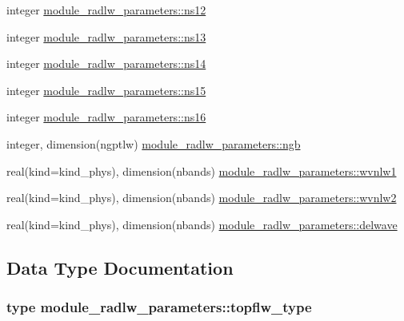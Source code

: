 \begin{DoxyCompactItemize}
\item 
integer \hyperlink{namespacemodule__radlw__parameters_aabdc77471aadc2932eb213f3b7ecb66c}{module\+\_\+radlw\+\_\+parameters\+::ns12}
\item 
integer \hyperlink{namespacemodule__radlw__parameters_a239c74495526cdf72b28e1f5c1d0318e}{module\+\_\+radlw\+\_\+parameters\+::ns13}
\item 
integer \hyperlink{namespacemodule__radlw__parameters_a1d49c23da2ed69069a97f861a28a531e}{module\+\_\+radlw\+\_\+parameters\+::ns14}
\item 
integer \hyperlink{namespacemodule__radlw__parameters_a9662e6bd344b1dbbfa7cc4429753bb10}{module\+\_\+radlw\+\_\+parameters\+::ns15}
\item 
integer \hyperlink{namespacemodule__radlw__parameters_a3a7ba0b8f35271e7979deea86f834479}{module\+\_\+radlw\+\_\+parameters\+::ns16}
\item 
integer, dimension(ngptlw) \hyperlink{namespacemodule__radlw__parameters_a2c571bd14c9b7982a7968976858c7547}{module\+\_\+radlw\+\_\+parameters\+::ngb}
\item 
real(kind=kind\+\_\+phys), dimension(nbands) \hyperlink{namespacemodule__radlw__parameters_a3a7370a94889d0cbaf6057404830d978}{module\+\_\+radlw\+\_\+parameters\+::wvnlw1}
\item 
real(kind=kind\+\_\+phys), dimension(nbands) \hyperlink{namespacemodule__radlw__parameters_ace30abd03d144096ee6b444b46081b58}{module\+\_\+radlw\+\_\+parameters\+::wvnlw2}
\item 
real(kind=kind\+\_\+phys), dimension(nbands) \hyperlink{namespacemodule__radlw__parameters_a6ad1dff8ffc039d03c5cf3059344308e}{module\+\_\+radlw\+\_\+parameters\+::delwave}
\end{DoxyCompactItemize}


\subsection{Data Type Documentation}
\label{structmodule__radlw__parameters_1_1topflw__type}
\hypertarget{namespacemodule__radlw__parameters_structmodule__radlw__parameters_1_1topflw__type}{}
\subsubsection{type module\+\_\+radlw\+\_\+parameters\+:\+:topflw\+\_\+type}


